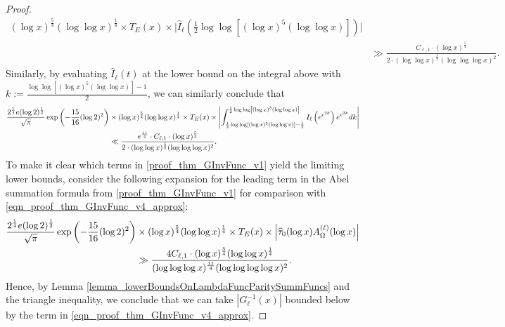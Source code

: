 \documentclass[11pt,reqno,a4letter]{article}
\numberwithin{figure}{section}
\numberwithin{table}{section}
\theoremstyle{plain}
\numberwithin{theorem}{section}
\theoremstyle{definition}
\begin{document}
\begin{proof}
\begin{align}
     (\log x)^{\frac{5}{4}} (\log\log x)^{\frac{1}{4}} \times T_E(x) \times 
     \Biggl\lvert 
     \widehat{I}_{\ell}\left(\frac{1}{2} \log\log\left[(\log x)^{5} (\log\log x)\right]\right)
     \Biggr\rvert \\ 
\label{eqn_proof_thm_GInvFunc_v4_approx} 
     & \gg \frac{C_{\ell,1} \cdot (\log x)^{\frac{5}{4}}}{2 \cdot  
     (\log\log x)^{\frac{5}{2}} (\log\log\log x)^2}. 
\end{align} 
Similarly, by evaluating $\widehat{I}_{\ell}(t)$ at the 
lower bound on the integral above with 
$k := \frac{\log\log\left[(\log x)^{5} (\log\log x)\right] - 1}{2}$, 
we can similarly conclude that 
\begin{align} 
\notag 
\frac{2^{\frac{1}{4}} e (\log 2)^{\frac{1}{2}}}{\sqrt{\pi}} 
     \exp\left(-\frac{15}{16} (\log 2)^2\right) & \times 
     (\log x)^{\frac{5}{4}} (\log\log x)^{\frac{1}{4}} \times T_E(x) \times 
     \left\lvert 
     \int_{\frac{1}{2} \log\log\left[(\log x)^{5} (\log\log x)\right] - 
     \frac{1}{2}}^{\frac{1}{2} \log\log\left[(\log x)^{5} (\log\log x)\right]} 
     I_{\ell}\left(e^{e^{2k}}\right) 
     e^{e^{2k}} dk \right\rvert \\ 
\label{eqn_proof_thm_GInvFunc_v4v2_approx} 
     & \ll 
     \frac{e^{\frac{11}{4}} \cdot C_{\ell,1} \cdot (\log x)^{\frac{5}{4}}}{2 \cdot  
     (\log\log x)^{\frac{5}{2}} (\log\log\log x)^2}. 
\end{align} 
To make it clear which terms in \eqref{proof_thm_GInvFunc_v1} 
yield the limiting lower bounds, consider the following expansion for the leading term in 
the Abel summation formula from \eqref{proof_thm_GInvFunc_v1} for comparison with 
\eqref{eqn_proof_thm_GInvFunc_v4_approx}: 
\begin{align} 
\notag 
\frac{2^{\frac{1}{4}} e (\log 2)^{\frac{1}{2}}}{\sqrt{\pi}} 
     \exp\left(-\frac{15}{16} (\log 2)^2\right) & \times 
     (\log x)^{\frac{5}{4}} (\log\log x)^{\frac{1}{4}} \times T_E(x) \times 
     \left\lvert \widehat{\tau}_0(\log x) A_{\Omega}^{(\ell)}(\log x) \right\rvert \\ 
\label{eqn_proof_thm_GInvFunc_v5_approx} 
     & \gg \frac{4 C_{\ell,1} \cdot (\log x)^{\frac{5}{4}} (\log\log x)^{\frac{1}{4}}}{ 
      (\log\log\log x)^{\frac{11}{4}} (\log\log\log\log x)^2}. 
\end{align} 
Hence, by 
Lemma \ref{lemma_lowerBoundsOnLambdaFuncParitySummFuncs} and the triangle inequality, 
we conclude that we can take $\left\lvert G_{\ell}^{-1}\left(x\right) \right\rvert$ 
bounded below by the term in 
\eqref{eqn_proof_thm_GInvFunc_v4_approx}. 
\end{proof} 
\end{document}
